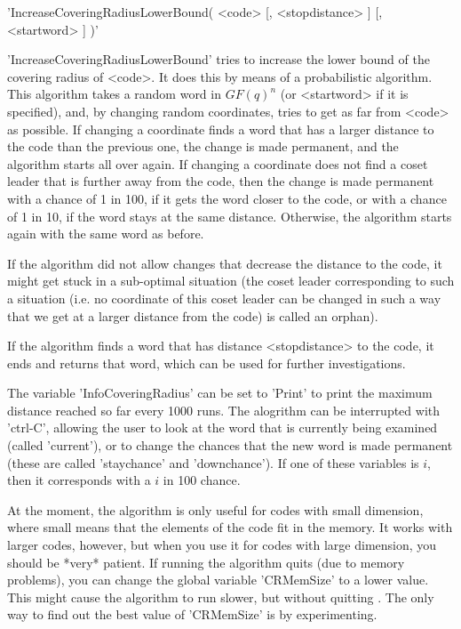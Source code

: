 
'IncreaseCoveringRadiusLowerBound( <code> [, <stopdistance> ] [, <startword> ] )'

'IncreaseCoveringRadiusLowerBound' tries to increase the lower bound
of the covering radius of <code>.
It does this by means of a probabilistic algorithm.
This algorithm takes a random word in $GF(q)^n$
(or <startword> if it is specified),
and, by changing random coordinates, tries to
get as far from <code> as possible.
If changing a coordinate finds a word that has a larger
distance to the code than the previous one,
the change is made permanent, and the algorithm starts all over again.
If changing a coordinate does not find a coset leader that is further
away from the code, then the change is made permanent with
a chance of 1 in 100, if it gets the word closer to the code,
or with a chance of 1 in 10, if the word stays at the same distance.
Otherwise, the algorithm starts again with the same word as before.

If the algorithm did not allow changes that decrease the
distance to the code, it might get
stuck in a sub-optimal situation (the coset leader corresponding to
such a situation (i.e. no coordinate of this coset leader can be
changed in such a way that we get at a larger distance from the code)
is called an orphan).

If the algorithm finds a word that has distance <stopdistance>
to the code,
it ends and returns that word, which can be used for
further investigations.

The variable 'InfoCoveringRadius' can be set to 'Print' to
print the maximum distance reached so far every 1000 runs.
The alogrithm can be interrupted
with 'ctrl-C', allowing the user to look at the word that is
currently being examined (called 'current'), or to change
the chances that the new word is made permanent
(these are called 'staychance' and 'downchance').
If one of these variables is $i$, then it corresponds with
a $i$ in 100 chance.

At the moment, the algorithm is only useful for codes with
small dimension, where small means that the elements of the code
fit in the memory.
It works with larger codes, however, but when you use it for
codes with large dimension, you should be *very* patient.
If running the algorithm quits \GAP{} (due to memory problems),
you can change the global variable 'CRMemSize' to a lower value.
This might cause the algorithm to run slower, but without quitting
\GAP{}.
The only way to find out the best value of 'CRMemSize' is by
experimenting.


